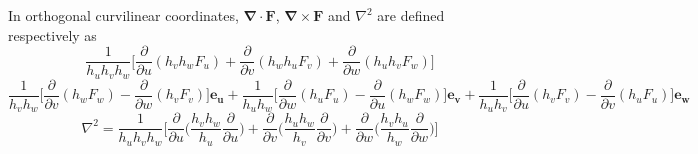 \documentclass[a4paper]{article}
\begin{document}
\begin{prop}
In orthogonal curvilinear coordinates, $\boldsymbol{\nabla}\cdot\mathbf{F}$, $\boldsymbol{\nabla}\times\mathbf{F}$ and $\nabla^2$ are defined respectively as
\begin{equation}
    \frac{1}{h_uh_vh_w}\bigg[\frac{\partial}{\partial u}(h_vh_wF_u)+\frac{\partial}{\partial v}(h_wh_uF_v)+\frac{\partial}{\partial w}(h_uh_vF_w)\bigg]\tag{1.15}
\end{equation}
\begin{equation}
    \frac{1}{h_vh_w}\bigg[\frac{\partial}{\partial v}(h_wF_w)-\frac{\partial}{\partial w}(h_vF_v)\bigg]\mathbf{e_u}+\frac{1}{h_uh_w}\bigg[\frac{\partial}{\partial w}(h_uF_u)-\frac{\partial}{\partial u}(h_wF_w)\bigg]\mathbf{e_v}+\frac{1}{h_uh_v}\bigg[\frac{\partial}{\partial u}(h_vF_v)-\frac{\partial}{\partial v}(h_uF_u)\bigg]\mathbf{e_w}\tag{1.16}
\end{equation}
\begin{equation}
    \nabla^2=\frac{1}{h_uh_vh_w}\bigg[\frac{\partial}{\partial u}\bigg(\frac{h_vh_w}{h_u}\frac{\partial }{\partial u}\bigg)+\frac{\partial}{\partial v}\bigg(\frac{h_uh_w}{h_v}\frac{\partial }{\partial v}\bigg)+\frac{\partial}{\partial w}\bigg(\frac{h_vh_u}{h_w}\frac{\partial }{\partial w}\bigg)\bigg]\tag{1.17}
\end{equation}
\end{prop}
\end{document}
